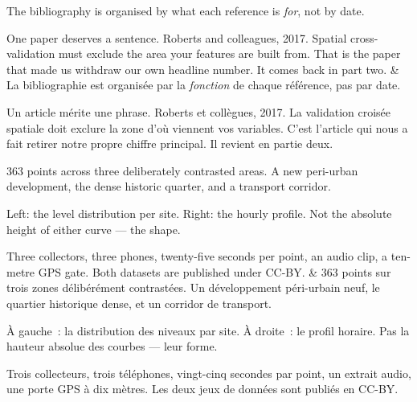 \documentclass[10pt,a4paper]{article}
\begin{document}
\begin{say}
The bibliography is organised by what each reference is \emph{for}, not by date.

One paper deserves a sentence. Roberts and colleagues, 2017. Spatial
cross-validation must exclude the area your features are built from. That is the
paper that made us withdraw our own headline number. It comes back in part two.
&
La bibliographie est organisée par la \emph{fonction} de chaque référence, pas par
date.

Un article mérite une phrase. Roberts et collègues, 2017. La validation croisée
spatiale doit exclure la zone d'où viennent vos variables. C'est l'article qui
nous a fait retirer notre propre chiffre principal. Il revient en partie deux.
\end{say}

\begin{say}
363 points across three deliberately contrasted areas. A new peri-urban
development, the dense historic quarter, and a transport corridor.

Left: the level distribution per site. Right: the hourly profile.  Not the absolute height of either
curve --- the shape.

Three collectors, three phones, twenty-five seconds per point, an audio clip, a
ten-metre GPS gate. Both datasets are published under CC-BY.
&
363 points sur trois zones délibérément contrastées. Un développement
péri-urbain neuf, le quartier historique dense, et un corridor de transport.

À gauche~: la distribution des niveaux par site. À droite~: le profil horaire.
 Pas la hauteur
absolue des courbes --- leur forme.

Trois collecteurs, trois téléphones, vingt-cinq secondes par point, un extrait
audio, une porte GPS à dix mètres. Les deux jeux de données sont publiés en CC-BY.
\end{say}
\end{document}
